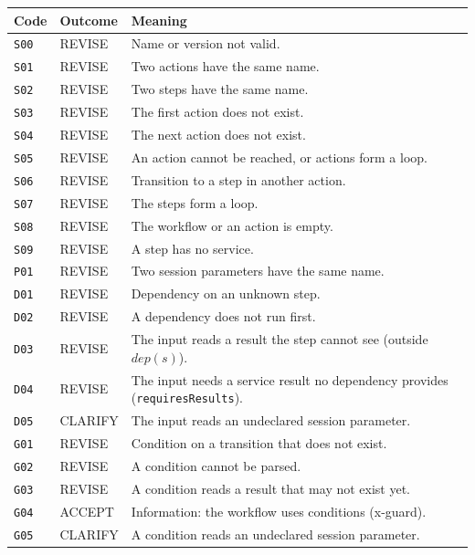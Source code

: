 \documentclass[a4paper]{arrowhead}
\begin{document}
{\small
\begin{longtable}{|p{1.3cm}|p{1.9cm}|p{12.8cm}|}

\hline
\rowcolor{gray!33} Code & Outcome & Meaning \\ \hline
\endhead
\texttt{S00} & REVISE & Name or version not valid. \\ \hline
\texttt{S01} & REVISE & Two actions have the same name. \\ \hline
\texttt{S02} & REVISE & Two steps have the same name. \\ \hline
\texttt{S03} & REVISE & The first action does not exist. \\ \hline
\texttt{S04} & REVISE & The next action does not exist. \\ \hline
\texttt{S05} & REVISE & An action cannot be reached, or actions form a loop. \\ \hline
\texttt{S06} & REVISE & Transition to a step in another action. \\ \hline
\texttt{S07} & REVISE & The steps form a loop. \\ \hline
\texttt{S08} & REVISE & The workflow or an action is empty. \\ \hline
\texttt{S09} & REVISE & A step has no service. \\ \hline
\texttt{P01} & REVISE & Two session parameters have the same name. \\ \hline
\texttt{D01} & REVISE & Dependency on an unknown step. \\ \hline
\texttt{D02} & REVISE & A dependency does not run first. \\ \hline
\texttt{D03} & REVISE & The input reads a result the step cannot see (outside $dep(s)$). \\ \hline
\texttt{D04} & REVISE & The input needs a service result no dependency provides (\texttt{requires\allowbreak{}Results}). \\ \hline
\texttt{D05} & CLARIFY & The input reads an undeclared session parameter. \\ \hline
\texttt{G01} & REVISE & Condition on a transition that does not exist. \\ \hline
\texttt{G02} & REVISE & A condition cannot be parsed. \\ \hline
\texttt{G03} & REVISE & A condition reads a result that may not exist yet. \\ \hline
\texttt{G04} & ACCEPT & Information: the workflow uses conditions (x-guard). \\ \hline
\texttt{G05} & CLARIFY & A condition reads an undeclared session parameter. \\ \hline

\end{longtable}}
\end{document}
